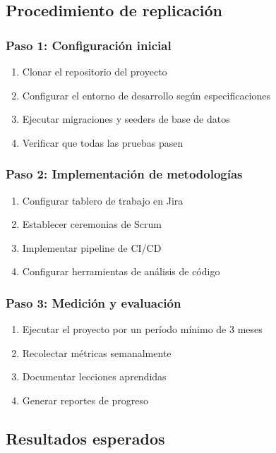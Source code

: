 \subsection{Procedimiento de replicación}

\subsubsection{Paso 1: Configuración inicial}
\begin{enumerate}
  \item Clonar el repositorio del proyecto
  \item Configurar el entorno de desarrollo según especificaciones
  \item Ejecutar migraciones y seeders de base de datos
  \item Verificar que todas las pruebas pasen
\end{enumerate}

\subsubsection{Paso 2: Implementación de metodologías}
\begin{enumerate}
  \item Configurar tablero de trabajo en Jira
  \item Establecer ceremonias de Scrum
  \item Implementar pipeline de CI/CD
  \item Configurar herramientas de análisis de código
\end{enumerate}

\subsubsection{Paso 3: Medición y evaluación}
\begin{enumerate}
  \item Ejecutar el proyecto por un período mínimo de 3 meses
  \item Recolectar métricas semanalmente
  \item Documentar lecciones aprendidas
  \item Generar reportes de progreso
\end{enumerate}

\subsection{Resultados esperados}

